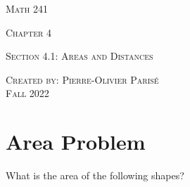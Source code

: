 \documentclass[12pt,a4paper]{article}
\begin{document}
\thispagestyle{empty}

\begin{center}
\vspace*{2.5cm}

{\Huge \textsc{Math 241}}

\vspace*{2cm}

{\LARGE \textsc{Chapter 4}} 

\vspace*{0.75cm}

\noindent\textsc{Section 4.1: Areas and Distances}

\vspace*{0.75cm}

\tableofcontents

\vfill

\noindent \textsc{Created by: Pierre-Olivier Paris{\'e}} \\
\textsc{Fall 2022}
\end{center}

\newpage

\section{Area Problem}

	What is the area of the following shapes?
	
\end{document}
